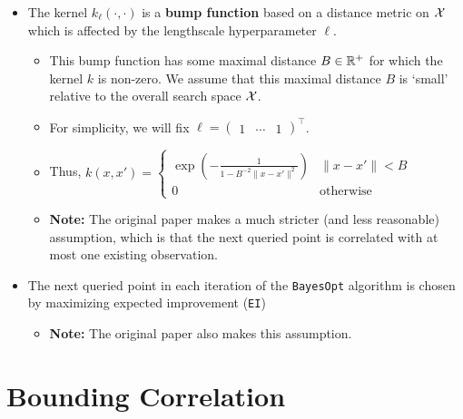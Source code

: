 \documentclass[11pt]{article}
\numberwithin{figure}{section}
\numberwithin{equation}{section}
\def\BayesOpt{\texttt{BayesOpt}}
\def\EI{\texttt{EI}}
\newcommand{\bs}[1]{\boldsymbol{#1}}
\def\bell{\bs{\ell}}
\begin{document}
\begin{itemize}[label=]
  \item The kernel $k_{\bell}(\cdot, \cdot)$ is a \textbf{bump function} based on a distance metric on $\mathcal{X}$ which is affected by the lengthscale hyperparameter $\bell$.
  \begin{itemize}[label=]
    \item This bump function has some maximal distance $B \in \mathbb{R}^{+}$ for which the kernel $k$ is non-zero. We assume that this maximal distance $B$ is `small' relative to the overall search space $\mathcal{X}$.
    \item For simplicity, we will fix $\bell = \begin{pmatrix}1 & \cdots & 1 
    \end{pmatrix}^{\top}$.
    \item Thus, $k(x, x') = \begin{cases}\exp\left(-\frac{1}{1 - B^{-2}\lVert x - x' \rVert^{2}}\right) & \lVert x - x' \rVert < B\\ 0 & \textrm{otherwise}\end{cases}$
    \item \textbf{Note:} The original paper makes a much stricter (and less reasonable) assumption, which is that the next queried point is correlated with at most one existing observation.
  \end{itemize}

  \item The next queried point in each iteration of the \BayesOpt{} algorithm is chosen by maximizing expected improvement (\EI{})
  \begin{itemize}[label=]
    \item \textbf{Note:} The original paper also makes this assumption.
  \end{itemize}

\end{itemize}

\section{Bounding Correlation}
\end{document}
